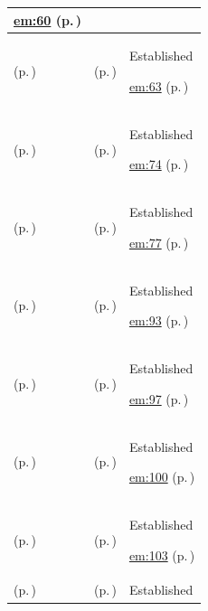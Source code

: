 \begin{longtable}{|>{\raggedright\arraybackslash}p{0.27\TableWidth}|>{\raggedright\arraybackslash}p{0.27\TableWidth}|>{\raggedright\arraybackslash}p{0.46\TableWidth}|}
 \hyperref[rad:em:55]{em:60} (p.\,\pageref{rad:em:55})\\\hline
\nameref{service:representative-authority-verification} (p.\,\pageref{service:representative-authority-verification}) & \nameref{feature:feat-em-08} (p.\,\pageref{feature:feat-em-08}) & Established

 \hyperref[rad:em:55]{em:63} (p.\,\pageref{rad:em:55})\\\hline
\nameref{service:consent-decision-service} (p.\,\pageref{service:consent-decision-service}) & \nameref{feature:feat-em-09} (p.\,\pageref{feature:feat-em-09}) & Established

 \hyperref[rad:em:69]{em:74} (p.\,\pageref{rad:em:69})\\\hline
\nameref{service:confidentiality-restriction-evaluation} (p.\,\pageref{service:confidentiality-restriction-evaluation}) & \nameref{feature:feat-em-10} (p.\,\pageref{feature:feat-em-10}) & Established

 \hyperref[rad:em:69]{em:77} (p.\,\pageref{rad:em:69})\\\hline
\nameref{service:practitioner-verification-service} (p.\,\pageref{service:practitioner-verification-service}) & \nameref{feature:feat-em-11} (p.\,\pageref{feature:feat-em-11}) & Established

 \hyperref[rad:em:86]{em:93} (p.\,\pageref{rad:em:86})\\\hline
\nameref{service:practitioner-directory-query} (p.\,\pageref{service:practitioner-directory-query}) & \nameref{feature:feat-em-12} (p.\,\pageref{feature:feat-em-12}) & Established

 \hyperref[rad:em:86]{em:97} (p.\,\pageref{rad:em:86})\\\hline
\nameref{service:practitioner-role-resolution} (p.\,\pageref{service:practitioner-role-resolution}) & \nameref{feature:feat-em-13} (p.\,\pageref{feature:feat-em-13}) & Established

 \hyperref[rad:em:86]{em:100} (p.\,\pageref{rad:em:86})\\\hline
\nameref{service:practitioner-endpoint-lookup} (p.\,\pageref{service:practitioner-endpoint-lookup}) & \nameref{feature:feat-em-14} (p.\,\pageref{feature:feat-em-14}) & Established

 \hyperref[rad:em:86]{em:103} (p.\,\pageref{rad:em:86})\\\hline
\nameref{service:practitioner-affiliation-resolution} (p.\,\pageref{service:practitioner-affiliation-resolution}) & \nameref{feature:feat-em-15} (p.\,\pageref{feature:feat-em-15}) & Established


\end{longtable}
